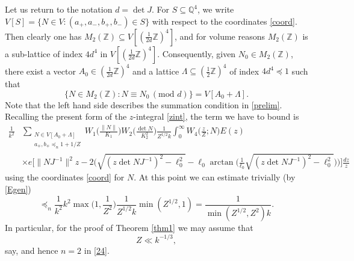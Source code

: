 \documentclass[11pt]{amsart}
\numberwithin{equation}{section}
\theoremstyle{plain}
\theoremstyle{definition}
\numberwithin{equation}{section}
\begin{document}
Let us return to the notation $d = \det J$.  For $S \subseteq \mathbb{Q}^4$, we write $V[S] = \{N \in V: (a_+, a_-, b_+, b_-) \in S\}$ with respect to the   coordinates \eqref{coord}. Then clearly one has $M_2(\mathbb{Z}) \subseteq V[(\frac{1}{2d} \mathbb{Z})^4]$, and for volume reasons  $M_2(\mathbb{Z})$ is a sub-lattice of index $4d^4$ in $V[(\frac{1}{2d} \mathbb{Z})^4]$. Consequently, given $N_0 \in M_2(\mathbb{Z})$, there exist a vector $A_0 \in (\frac{1}{2d }\mathbb{Z})^4$ and a lattice $\Lambda \subseteq (\frac{1}{2}\mathbb{Z})^4$ of index $4d^4 \preccurlyeq 1$ such that
$$\{N \in M_2(\mathbb{Z}) : N \equiv N_0 \, (\text{mod } d)\} =  V[A_0 + \Lambda].$$
Note that the left hand side describes the summation condition in \eqref{prelim}. Recalling the present form of the $z$-integral \eqref{zint}, the term we have to bound is
\begin{align*}
    \frac{1}{k^2}&  \sum_{\substack{N \in  V[A_0 + \Lambda]\\ a_{\mp}, b_{\mp} \preccurlyeq_{n} 1+ 1/Z}} W_1\Big(\frac{\| N \|}{K_1}\Big) W_2\Big(\frac{\det N}{K_2^2}\Big)     \frac{1}{Z^{1/2} k} \int_0^{\infty} W_4\Big(\frac{z}{Z}; N\Big) E(z) \\
 &\times e\Big[\| N J^{-1} \|^2z - 2 \Big(\sqrt{(z \det NJ^{-1})^2 - \ell_0^2}  -  \ell_0 \arctan\Big(\frac{1}{\ell_0}\sqrt{ (z\det NJ^{-1} )^2 - \ell_0^2}\Big) \Big) \Big]\frac{dz}{z}
 \end{align*}
using the coordinates \eqref{coord} for $N$. At this point we can estimate trivially (by \eqref{Egen})
$$\preccurlyeq_{n} \frac{1}{k^2} k^2 \max\Big(1,  \frac{1}{Z^2}\Big) \frac{1}{Z^{1/2}k}  \min(Z^{1/2}, 1) = \frac{1}{\min(Z^{1/2}, Z^2) k}.$$ 
In particular, for the proof of Theorem \ref{thm1} we may assume that 
\begin{equation}\label{1/3}
   Z \ll k^{-1/3},
 \end{equation}  
    say, and hence $n= 2$ in \eqref{24}. 
\end{document}
